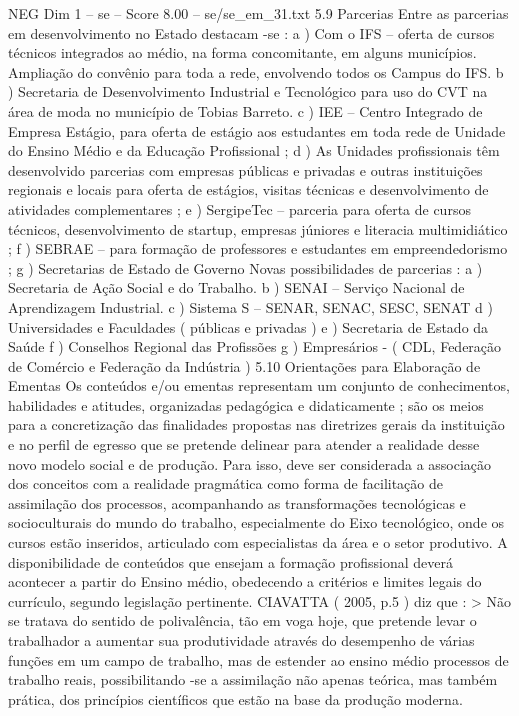 \begin{textsample}{NEG Dim 1 – se – Score 8.00 – se/se\_em\_31.txt}  \label{ex:f1_neg_206}
5.9 Parcerias Entre as parcerias em desenvolvimento no Estado destacam -se : a ) Com o IFS – oferta de cursos técnicos integrados ao médio, na forma concomitante, em alguns municípios.
Ampliação do convênio para toda a rede, envolvendo todos os Campus do IFS. b ) Secretaria de Desenvolvimento Industrial e Tecnológico para uso do CVT na área de moda no município de Tobias Barreto. c ) IEE – Centro Integrado de Empresa Estágio, para oferta de estágio aos estudantes em toda rede de Unidade do Ensino Médio e da Educação Profissional ; d ) As Unidades profissionais têm desenvolvido parcerias com empresas públicas e privadas e outras instituições regionais e locais para oferta de estágios, visitas técnicas e desenvolvimento de atividades complementares ; e ) SergipeTec – parceria para oferta de cursos técnicos, desenvolvimento de startup, empresas júniores e literacia multimidiático ; f ) SEBRAE – para formação de professores e estudantes em empreendedorismo ; g ) Secretarias de Estado de Governo Novas possibilidades de parcerias : a ) Secretaria de Ação Social e do Trabalho. b ) SENAI – Serviço Nacional de Aprendizagem Industrial. c ) Sistema S – SENAR, SENAC, SESC, SENAT d ) Universidades e Faculdades ( públicas e privadas ) e ) Secretaria de Estado da Saúde f ) Conselhos Regional das Profissões g ) Empresários - ( CDL, Federação de Comércio e Federação da Indústria ) 5.10 Orientações para Elaboração de Ementas Os conteúdos e/ou ementas representam um conjunto de conhecimentos, habilidades e atitudes, organizadas pedagógica e didaticamente ; são os meios para a concretização das finalidades propostas nas diretrizes gerais da instituição e no perfil de egresso que se pretende delinear para atender a realidade desse novo modelo social e de produção.
Para isso, deve ser considerada a associação dos conceitos com a realidade pragmática como forma de facilitação de assimilação dos processos, acompanhando as transformações tecnológicas e socioculturais do mundo do trabalho, especialmente do Eixo tecnológico, onde os cursos estão inseridos, articulado com especialistas da área e o setor produtivo.
A disponibilidade de conteúdos que ensejam a formação profissional deverá acontecer a partir do Ensino médio, obedecendo a critérios e limites legais do currículo, segundo legislação pertinente.
CIAVATTA ( 2005, p.5 ) diz que : > Não se tratava do sentido de polivalência, tão em voga hoje, que pretende levar o trabalhador a aumentar sua produtividade através do desempenho de várias funções em um campo de trabalho, mas de estender ao ensino médio processos de trabalho reais, possibilitando -se a assimilação não apenas teórica, mas também prática, dos princípios científicos que estão na base da produção moderna.

\end{textsample}
